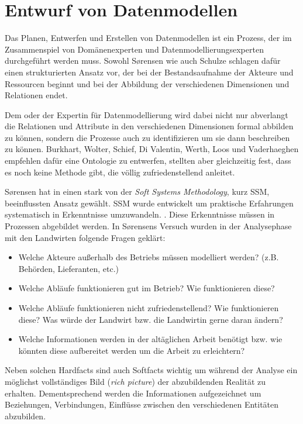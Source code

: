 \section{Entwurf von Datenmodellen}
Das Planen, Entwerfen und Erstellen von Datenmodellen ist ein Prozess, der im Zusammenspiel von Domänenexperten und Datenmodellierungsexperten durchgeführt werden muss. Sowohl S\o rensen wie auch Schulze schlagen dafür einen strukturierten Ansatz vor, der bei der Bestandsaufnahme der Akteure und Ressourcen beginnt und bei der Abbildung der verschiedenen Dimensionen und Relationen endet.\cite{jour:Schulze2007}\cite{jour:Sorensen2010}

Dem oder der Expertin für Datenmodellierung wird dabei nicht nur abverlangt die Relationen und Attribute in den verschiedenen Dimensionen formal abbilden zu können, sondern die Prozesse auch zu identifizieren um sie dann beschreiben zu können. Burkhart, Wolter, Schief, Di Valentin, Werth, Loos und Vaderhaeghen empfehlen dafür eine Ontologie zu entwerfen, stellten aber gleichzeitig fest, dass es noch keine Methode gibt, die völlig zufriedenstellend anleitet.\cite{jour:Burkhart2012} 

S\o rensen hat in \cite{jour:Sorensen2010} einen stark von der \textit{Soft Systems Methodology}, kurz SSM, beeinflussten Ansatz gewählt. SSM wurde entwickelt um praktische Erfahrungen systematisch in Erkenntnisse umzuwandeln. \cite{jour:Checkland2000}. Diese Erkenntnisse müssen in Prozessen abgebildet werden. In S\o rensens Versuch wurden in der Analysephase mit den Landwirten folgende Fragen geklärt:
\begin{itemize}
 \item Welche Akteure außerhalb des Betriebs müssen modelliert werden? (z.B. Behörden, Lieferanten, etc.)
 \item Welche Abläufe funktionieren gut im Betrieb? Wie funktionieren diese?
 \item Welche Abläufe funktionieren nicht zufriedenstellend? Wie funktionieren diese? Was würde der Landwirt bzw. die Landwirtin gerne daran ändern?
 \item Welche Informationen werden in der altäglichen Arbeit benötigt bzw. wie könnten diese aufbereitet werden um die Arbeit zu erleichtern?
\end{itemize}

Neben solchen Hardfacts sind auch Softfacts wichtig um während der Analyse ein möglichst vollständiges Bild (\textit{rich picture}) der abzubildenden Realität zu erhalten. Dementsprechend werden die Informationen aufgezeichnet um Beziehungen, Verbindungen, Einflüsse zwischen den verschiedenen Entitäten abzubilden.

